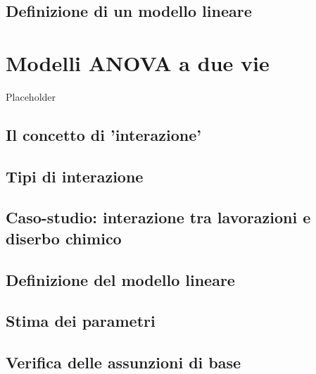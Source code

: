 \documentclass[a4paper,12pt,oneside]{book}
\begin{document}
\hypertarget{definizione-di-un-modello-lineare-2}{%
\section{Definizione di un modello lineare}\label{definizione-di-un-modello-lineare-2}}

\hypertarget{modelli-anova-a-due-vie}{%
\chapter{Modelli ANOVA a due vie}\label{modelli-anova-a-due-vie}}

Placeholder

\hypertarget{il-concetto-di-interazione}{%
\section{Il concetto di 'interazione'}\label{il-concetto-di-interazione}}

\hypertarget{tipi-di-interazione}{%
\section{Tipi di interazione}\label{tipi-di-interazione}}

\hypertarget{caso-studio-interazione-tra-lavorazioni-e-diserbo-chimico}{%
\section{Caso-studio: interazione tra lavorazioni e diserbo chimico}\label{caso-studio-interazione-tra-lavorazioni-e-diserbo-chimico}}

\hypertarget{definizione-del-modello-lineare}{%
\section{Definizione del modello lineare}\label{definizione-del-modello-lineare}}

\hypertarget{stima-dei-parametri-2}{%
\section{Stima dei parametri}\label{stima-dei-parametri-2}}

\hypertarget{verifica-delle-assunzioni-di-base}{%
\section{Verifica delle assunzioni di base}\label{verifica-delle-assunzioni-di-base}}
\end{document}
